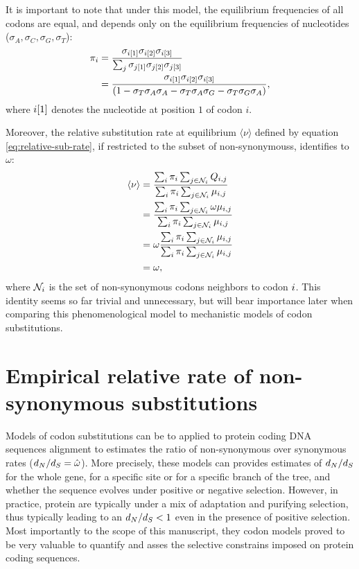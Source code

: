 It is important to note that under this model, the equilibrium frequencies of all \glspl{codon} are equal, and depends only on the equilibrium frequencies of nucleotides ($\sigma_{A}, \sigma_{C}, \sigma_{G}, \sigma_{T}$):
\begin{align}
\pi_{{i}} & = \dfrac{\sigma_{{i}[1]}\sigma_{{i}[2]}\sigma_{{i}[3]}}{\sum_{{j}}\sigma_{{j}[1]}\sigma_{{j}[2]}\sigma_{{j}[3]} } \\
 & = \dfrac{\sigma_{{i}[1]}\sigma_{{i}[2]}\sigma_{{i}[3]}}{(1 - \sigma_{T}\sigma_{A}\sigma_{A} - \sigma_{T}\sigma_{A}\sigma_{G} - \sigma_{T}\sigma_{G}\sigma_{A} )},
\end{align}
where ${i}[1]$ denotes the nucleotide at position $1$ of \gls{codon} $i$.

Moreover, the relative \gls{substitution} rate at equilibrium $\langle \nu \rangle$ defined by equation \ref{eq:relative-sub-rate}, if restricted to the subset of \glspl{non-synonymous}, identifies to $\omega$:
\begin{align}
\langle \nu \rangle & = \dfrac{ \sum_{{i}} \pi_{{i}} \sum_{{j} \in \mathcal{N}_{{i}}} Q_{{i}, {j}}}{\sum_{{i}} \pi_{{i}} \sum_{{j} \in \mathcal{N}_{{i}}} \mu_{{i}, {j}}} \\
					& = \dfrac{ \sum_{{i}} \pi_{{i}} \sum_{{j} \in \mathcal{N}_{{i}}} \omega \mu_{{i}, {j}}}{\sum_{{i}} \pi_{{i}} \sum_{{j} \in \mathcal{N}_{{i}}} \mu_{{i}, {j}}} \\
					& = \omega \dfrac{ \sum_{{i}} \pi_{{i}} \sum_{{j} \in \mathcal{N}_{{i}}} \mu_{{i}, {j}}}{\sum_{{i}} \pi_{{i}} \sum_{{j} \in \mathcal{N}_{{i}}} \mu_{{i}, {j}}} \\
					& = \omega, 
\end{align}
where $\mathcal{N}_{{i}}$ is the set of non-synonymous \glspl{codon} neighbors to \gls{codon} ${i}$.
This identity seems so far trivial and unnecessary, but will bear importance later when comparing this phenomenological model to mechanistic models of \gls{codon} \glspl{substitution}.


\section{Empirical relative rate of non-synonymous substitutions}
Models of \gls{codon} \glspl{substitution} can be to applied to protein coding \acrshort{DNA} sequences alignment to estimates the ratio of non-synonymous over \gls{synonymous} rates ($d_N / d_S=\hat{\omega}$).
More precisely, these models can provides estimates of $d_N / d_S$ for the whole gene, for a specific site or for a specific branch of the tree, and whether the sequence evolves under positive or negative selection.
However, in practice, protein are typically under a mix of adaptation and purifying selection, thus typically leading to an $d_N / d_S<1$ even in the presence of positive selection.
Most importantly to the scope of this manuscript, they \gls{codon} models proved to be very valuable to quantify and asses the selective constrains imposed on protein coding sequences.

